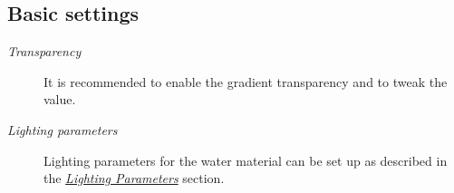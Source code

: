 \documentclass[a4paper,12pt,oneside]{sphinxmanual}
\begin{document}
\subsection{Basic settings}
\label{outdoor_rendering:id4}\begin{description}
\item[{\emph{Transparency}}] \leavevmode
It is recommended to enable the gradient transparency  and to tweak the  value.

\item[{\emph{Lighting parameters}}] \leavevmode
Lighting parameters for the water material can be set up as described in the {\hyperref[materials:material-lighting-params]{\emph{Lighting Parameters}}} section.

\end{description}
\end{document}
